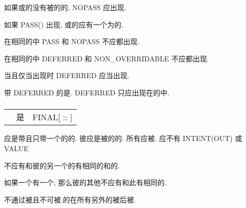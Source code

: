 如果\TypeBound{}\Procedure{}或\Final{}\Subroutine{}的\Interface{}没有被\Define{}的\Type{}的\Argument{}, NOPASS 应出现.

如果 PASS(\tit{\Argument{}\Name{}}) 出现, \TypeBound{}\Procedure{}或\Final{}\Subroutine{}的\Interface{}应有一个\Name{}为\tit{\Argument{}\Name{}}的\DummyArgument{}.

在相同的\tit{\Bind{}\Attribute{}\List{}}中 PASS 和 NOPASS 不应都出现.

在相同的\tit{\Bind{}\Attribute{}\List{}}中 DEFERRED 和 NON\_{}OVERRIDABLE 不应都出现.

当且仅当\tit{\Interface{}\Name{}}出现时 DEFERRED 应当出现.

带 DEFERRED \Attribute{}的\TypeBound{}\Procedure{}是\DeferredTypeBoundProcedure{}. DEFERRED \Keyword{}只应出现在\AbstractType{}的\Definition{}中.

\subsubsection{\Final{}\Subroutine{}}

\begin{tabular}{lll}
    \tit{\Final{}\Procedure{}\Statement{}}&是&FINAL[ :: ]\tit{\Final{}\Subroutine{}\Name{}\List{}}\\
\end{tabular}

\tit{\Final{}\Subroutine{}\Name{}}应是带且只带一个\DummyArgument{}的\Module{}\Procedure{}的\Name{}. 彼\Argument{}应是被\Define{}的\DerivedType{}的\Nonoptional{}\Noncoarray{}\Nonpointer{}\Nonallocatable{}\Nonpolymorphic{}\Variable{}. 所有\Length{}\TypeParameter{}应被\Assume{}. \DummyArgument{}应不有 INTENT(OUT) 或 VALUE \Attribute{}

\Final{}\Subroutine{}不应有和彼\Type{}的另一个\Final{}\Subroutine{}的\DummyArgument{}有相同的\Kind{}\TypeParameter{}和\Rank{}的\DummyArgument{}.

如果一个\Final{}\Subroutine{}有一个\AssumedRankArray{}\DummyArgument{}, 那么彼\Type{}的其他\Final{}\Subroutine{}不应有和此\AssumedRankArray{}\DummyArgument{}有相同\Kind{}\TypeParameter{}的\DummyArgument{}.

\Final{}\Subroutine{}不通过\Type{}\Extension{}被\Inherit{}且不可被\Override{}.\Parent{}\Type{}的\Final{}\Subroutine{}在\Extended{}\Type{}所有另外的\Final{}\Subroutine{}被\Call{}后被\Call{}.
